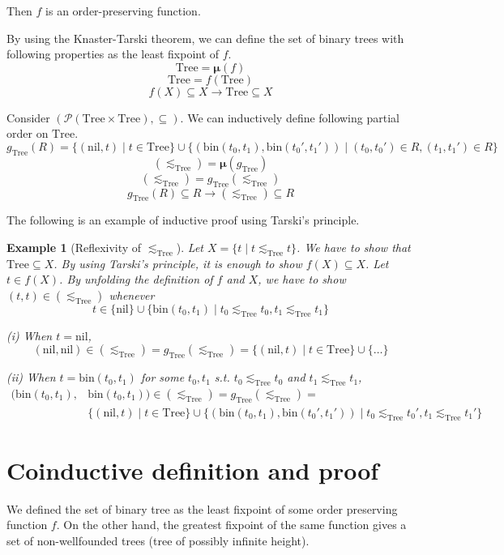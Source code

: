 \documentclass{article}
\newtheorem{example}[theorem]{Example}
\newcommand\pow[1]{\mathcal{P}(#1)}
\newcommand\Tree[0]{\text{Tree}}
\newcommand\nil[0]{\text{nil}}
\newcommand\bin[0]{\text{bin}}
\newcommand\fix[0]{\boldsymbol{\mu}}
\begin{document}
  Then $f$ is an order-preserving function.

  By using the Knaster-Tarski theorem, we can define the set of binary trees with following properties
  as the least fixpoint of $f$.
  $$ \Tree = \fix(f) $$
  $$ \Tree = f(\Tree) $$
  $$ f(X) \subseteq X \to \Tree \subseteq X $$

  Consider $(\pow{\Tree \times \Tree}, \subseteq)$.
  We can inductively define following partial order on $\Tree$.
  $$ g_{\Tree}(R) =
    \{(\nil,t) \mid t \in \Tree\} \cup
    \{(\bin(t_0, t_1), \bin(t_0', t_1')) \mid (t_0, t_0') \in R, (t_1, t_1') \in R \}
  $$
  $$ (\lesssim_{\Tree}) = \fix(g_{\Tree}) $$
  $$ (\lesssim_{\Tree}) = g_{\Tree}(\lesssim_{\Tree}) $$
  $$ g_{\Tree}(R) \subseteq R \to (\lesssim_{\Tree}) \subseteq R $$

  The following is an example of inductive proof using Tarski's principle.
  \begin{example}[Reflexivity of $\lesssim_{\Tree}$]
    Let $X = \{t \mid t \lesssim_{\Tree} t\}$. We have to show that $\Tree \subseteq X$.
    By using Tarski's principle, it is enough to show $f(X) \subseteq X$.
    Let $t \in f(X)$. By unfolding the definition of $f$ and $X$,
    we have to show $(t,t) \in (\lesssim_{\Tree})$ whenever
    $$ t \in \{\nil\} \cup \{\bin(t_0, t_1) \mid t_0 \lesssim_{\Tree} t_0, t_1 \lesssim_{\Tree} t_1\} $$

    (i) When $t = \nil$,
        $$ (\nil, \nil) \in (\lesssim_{\Tree}) = g_{\Tree}(\lesssim_{\Tree}) = 
           \{(\nil,t) \mid t \in \Tree\} \cup \{ \ldots \}
        $$

    (ii) When $t = \bin(t_0, t_1)$ for some $t_0, t_1$ s.t. $t_0 \lesssim_{\Tree} t_0$ and $t_1 \lesssim_{\Tree} t_1$,
        $$
          \begin{aligned}
            (\bin(t_0, t_1), & \bin(t_0, t_1)) \in (\lesssim_{\Tree}) = g_{\Tree}(\lesssim_{\Tree}) = \\
            & \{(\nil,t) \mid t \in \Tree\} \cup
              \{(\bin(t_0, t_1), \bin(t_0', t_1')) \mid t_0 \lesssim_{\Tree} t_0', t_1 \lesssim_{\Tree} t_1' \}
          \end{aligned}
        $$
  \end{example}

\section{Coinductive definition and proof}
  We defined the set of binary tree as the least fixpoint of some order preserving function $f$.
  On the other hand, the greatest fixpoint of the same function gives a set of non-wellfounded trees (tree of possibly infinite height).
\end{document}
